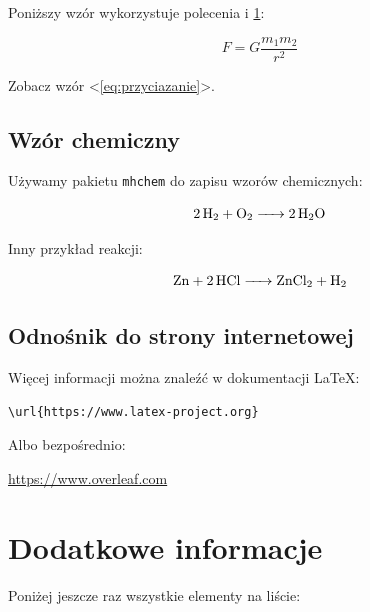 \documentclass[a4paper,12pt]{article}
\begin{document}
Poniższy wzór wykorzystuje polecenia \texttt{\label{}} i \texttt{\ref{}}:

\begin{equation}
    F = G \frac{m_1 m_2}{r^2}
\end{equation}

Zobacz wzór <\ref{eq:przyciazanie}>.

\subsection{Wzór chemiczny}

Używamy pakietu \texttt{mhchem} do zapisu wzorów chemicznych:

\[
    \ce{2H2 + O2 -> 2H2O}
\]

Inny przykład reakcji:

\[\ce{Zn + 2HCl -> ZnCl2 + H2}\]

\subsection{Odnośnik do strony internetowej}

Więcej informacji można znaleźć w dokumentacji LaTeX:

\begin{verbatim}
\url{https://www.latex-project.org}
\end{verbatim}

Albo bezpośrednio:

\url{https://www.overleaf.com}

\section{Dodatkowe informacje}

Poniżej jeszcze raz wszystkie elementy na liście:

\end{document}
